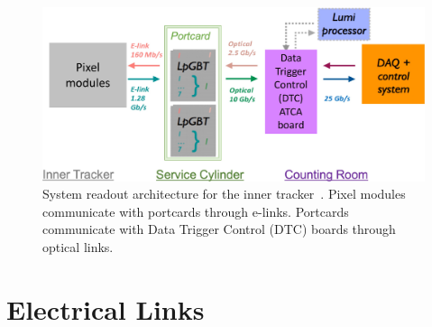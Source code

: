 \documentclass[a4paper,11pt]{article}
\newcommand{\fig}{Figure}
\begin{document}
\begin{figure}[htbp]
\centering
\includegraphics[width=1.0\textwidth,origin=c]{../figures/IT_System_Readout_2-crop.pdf}
\caption{
\label{fig:readout}
System readout architecture for the inner tracker~\cite{ref:orfanelli}. Pixel modules communicate with portcards through e-links. Portcards communicate with Data Trigger Control (DTC) boards through optical links.
}
\end{figure}

\section{Electrical Links}
\label{sec:electrical}



%
%
%
%
%


\end{document}
